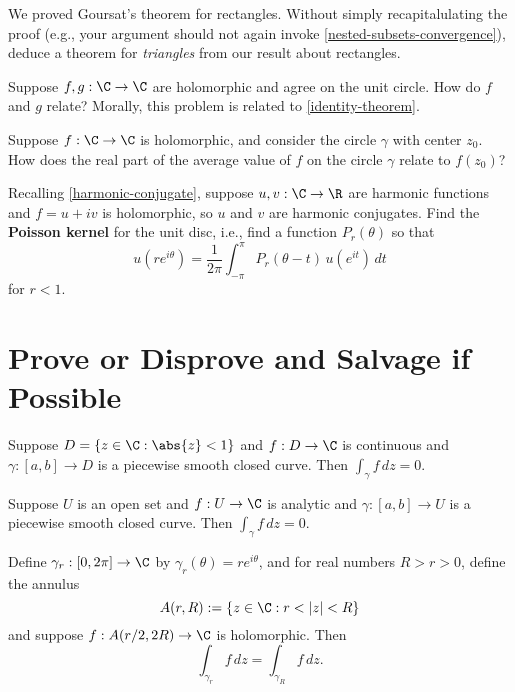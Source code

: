 \documentclass{homework}
\begin{document}
\begin{problem}
  We proved Goursat's theorem for rectangles.  Without simply
  recapitalulating the proof (e.g., your argument should not again
  invoke \ref{nested-subsets-convergence}), deduce a theorem for
  \textit{triangles} from our result about rectangles.
\end{problem}

\begin{problem}
  Suppose $f, g : \C \to \C$ are holomorphic and agree on the unit
  circle.  How do $f$ and $g$ relate?  Morally, this problem is
  related to \ref{identity-theorem}.
\end{problem}

 \begin{problem}
   Suppose $f : \C \to \C$ is holomorphic, and consider the circle
   $\gamma$ with center $z_0$.  How does the real part of the average
   value of $f$ on the circle $\gamma$ relate to $f(z_0)$?
 \end{problem}

 \begin{problem}
   Recalling \ref{harmonic-conjugate}, suppose $u, v : \C \to \R$ are
   harmonic functions and $f = u + iv$ is holomorphic, so $u$ and $v$
   are harmonic conjugates.  Find the \textbf{Poisson kernel} for the
   unit disc, i.e., find a function $P_r(\theta)$ so that
   \[
     u(re^{i\theta}) = \frac {1}{2\pi} \int_{-\pi }^{\pi } P_{r}(\theta -t) \, u(e^{it}) \, dt
   \]
   for $r < 1$.
 \end{problem}

\section{Prove or Disprove and Salvage if Possible}

\begin{problem}
  Suppose $D = \{ z \in \C : \abs{z} < 1 \}$ and $f : D \to \C$ is
  continuous and $\gamma : [a,b] \to D$ is a piecewise smooth closed curve.
  Then $\displaystyle\int_\gamma f\, dz = 0$.
\end{problem}
  
\begin{problem}
  Suppose $U$ is an open set and $f : U \to \C$ is analytic and
  $\gamma : [a,b] \to U$ is a piecewise smooth closed curve.  Then
  $\displaystyle\int_\gamma f \, dz = 0$.
\end{problem}

\begin{problem}
  Define $\gamma_r : [0,2\pi] \to \C$ by
  $\gamma_r(\theta) = r e^{i \theta}$, and for real numbers
  $R > r > 0$, define the annulus
  \[
    A(r,R) := \{ z \in \C : r < |z| < R \}
  \]
  and suppose $f : A(r/2,2R) \to \C$ is holomorphic.  Then
  \[
    \int_{\gamma_r} f \, dz = \int_{\gamma_R} f \, dz.
  \]
\end{problem}
\end{document}
